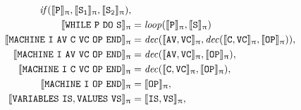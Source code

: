 \documentclass[a4paper,openany]{book}
\begin{document}
\begin{PiDen}
{\begin{align}
	\mathit{if(\llbracket \mathtt{P} \rrbracket_\uppi, \llbracket \mathtt{S_{\mathtt{1}}} \rrbracket_\uppi, \llbracket \mathtt{S_{\mathtt{2}}} \rrbracket_\uppi)}, \\
%
%
\llbracket \mathtt{\mbox{\tt WHILE}~ P ~\mbox{\tt DO}~ S} \rrbracket_\uppi  & =  
	\mathit{loop(\llbracket \mathtt{P} \rrbracket_\uppi, \llbracket \mathtt{S} \rrbracket_\uppi)} \\
%
%
%
%
\PIDEN{\mbox{\tt MACHINE} ~\mathtt{I} ~\mathtt{AV}~ \mathtt{C} ~\mathtt{VC}~ \mathtt{OP}~ \mbox{\tt END}} & =  
\mathit{dec}(\PIDEN{\mathtt{AV}, \mathtt{VC}}, \mathit{dec}(\PIDEN{\mathtt{C}, \mathtt{VC}}, \PIDEN{\mathtt{OP}})), \\
%
\PIDEN{\mbox{\tt MACHINE} ~\mathtt{I} ~\mathtt{AV}~\mathtt{VC}~ \mathtt{OP}~ \mbox{\tt END}} & =  
 \mathit{dec}(\PIDEN{\mathtt{AV}, \mathtt{VC}}, \PIDEN{\mathtt{OP}}), \\
%
\PIDEN{\mbox{\tt MACHINE} ~\mathtt{I} ~ \mathtt{C} ~\mathtt{VC}~ \mathtt{OP}~ \mbox{\tt END}} & =  
 \mathit{dec}(\PIDEN{\mathtt{C}, \mathtt{VC}}, \PIDEN{\mathtt{OP}}), \\
%
\PIDEN{\mbox{\tt MACHINE} ~\mathtt{I} ~ \mathtt{OP}~ \mbox{\tt END}} & =  \PIDEN{\mathtt{OP}}, \\
%
%
\PIDEN{\mbox{\tt VARIABLES} ~\mathtt{IS}, \mbox{\tt VALUES} ~\mathtt{VS}} & =  \PIDEN{\mathtt{IS}, \mathtt{VS}} , \\ 
%

\end{align}}
\end{PiDen}
\end{document}
